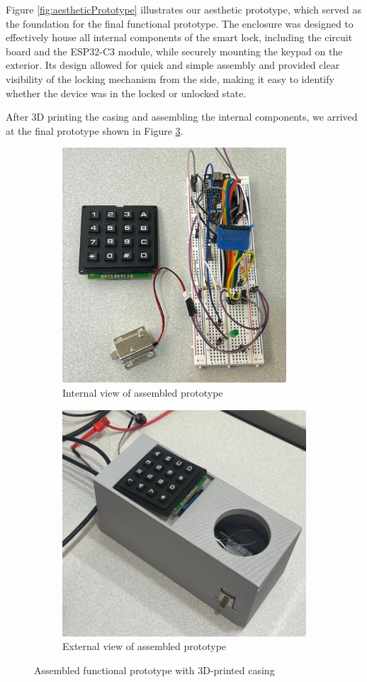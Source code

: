 Figure \ref{fig:aestheticPrototype} illustrates our aesthetic prototype, which served as the foundation for the final functional prototype. The enclosure was designed to effectively house all internal components of the smart lock, including the circuit board and the ESP32-C3 module, while securely mounting the keypad on the exterior. Its design allowed for quick and simple assembly and provided clear visibility of the locking mechanism from the side, making it easy to identify whether the device was in the locked or unlocked state.

After 3D printing the casing and assembling the internal components, we arrived at the final prototype shown in Figure \ref{fig:testOutside}.

\begin{figure}[!ht]
\centering
\begin{subfigure}{.5\textwidth}
  \centering
  \includegraphics[width=.7\linewidth]{img/prototypeInside.png}
  \caption{Internal view of assembled prototype}
  \label{fig:pInside}
\end{subfigure}%
\begin{subfigure}{.5\textwidth}
  \centering
  \includegraphics[width=.7\linewidth]{img/prototypeOutside.png}
  \caption{External view of assembled prototype}
  \label{fig:pOutside}
\end{subfigure}
\caption{Assembled functional prototype with 3D-printed casing}
\label{fig:testOutside}
\end{figure}

